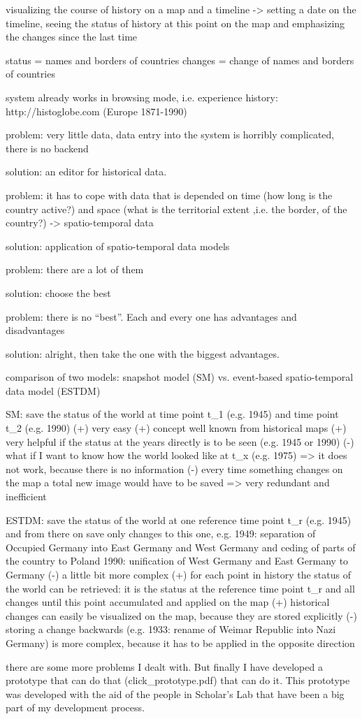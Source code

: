 visualizing the course of history on a map and a timeline
-> setting a date on the timeline, seeing the status of history at this point on the map and emphasizing the changes since the last time

status = names and borders of countries
changes = change of names and borders of countries

system already works in browsing mode, i.e. experience history:
http://histoglobe.com
(Europe 1871-1990)

problem: very little data, data entry into the system is horribly complicated, there is no backend

solution: an editor for historical data.

problem: it has to cope with data that is depended on time (how long is the country active?) and space (what is the territorial extent ,i.e. the border, of the country?) -> spatio-temporal data

solution: application of spatio-temporal data models

problem: there are a lot of them

solution: choose the best

problem: there is no ``best''. Each and every one has advantages and disadvantages

solution: alright, then take the one with the biggest advantages.

comparison of two models: snapshot model (SM) vs. event-based spatio-temporal data model (ESTDM)

SM: save the status of the world at time point t\_1 (e.g. 1945) and time point t\_2 (e.g. 1990)
(+) very easy
(+) concept well known from historical maps
(+) very helpful if the status at the years directly is to be seen (e.g. 1945 or 1990)
(-) what if I want to know how the world looked like at t\_x (e.g. 1975)
=> it does not work, because there is no information
(-) every time something changes on the map a total new image would have to be saved
=> very redundant and inefficient

ESTDM: save the status of the world at one reference time point t\_r (e.g. 1945) and from there on save only changes to this one, e.g.
1949: separation of Occupied Germany into East Germany and West Germany and ceding of parts of the country to Poland
1990: unification of West Germany and East Germany to Germany
(-) a little bit more complex
(+) for each point in history the status of the world can be retrieved: it is the status at the reference time point t\_r and all changes until this point accumulated and applied on the map
(+) historical changes can easily be visualized on the map, because they are stored explicitly
(-) storing a change backwards (e.g. 1933: rename of Weimar Republic into Nazi Germany) is more complex, because it has to be applied in the opposite direction

there are some more problems I dealt with. But finally I have developed a prototype that can do that (click\_prototype.pdf) that can do it. This prototype was developed with the aid of the people in Scholar's Lab that have been a big part of my development process.
